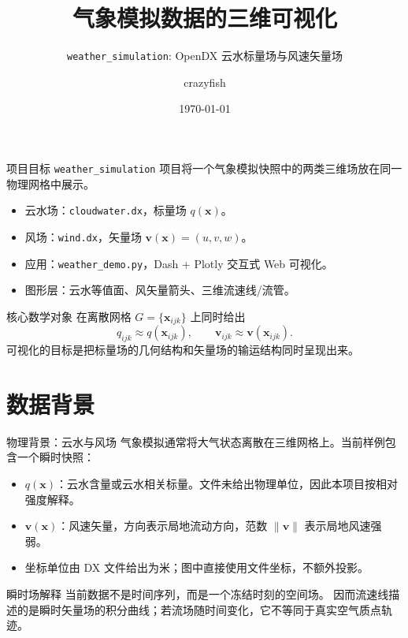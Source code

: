 \documentclass[aspectratio=169,11pt]{ctexbeamer}
\title{气象模拟数据的三维可视化}
\subtitle{\texttt{weather\_simulation}: OpenDX 云水标量场与风速矢量场}
\author{crazyfish}
\date{\today}
\newcommand{\vx}{\mathbf x}
\newcommand{\vv}{\mathbf v}
\begin{document}
\begin{frame}
  \titlepage
\end{frame}

\begin{frame}{项目目标}
  \texttt{weather\_simulation} 项目将一个气象模拟快照中的两类三维场放在同一物理网格中展示。

  \begin{itemize}
    \item 云水场：\texttt{cloudwater.dx}，标量场 $q(\vx)$。
    \item 风场：\texttt{wind.dx}，矢量场 $\vv(\vx)=(u,v,w)$。
    \item 应用：\texttt{weather\_demo.py}，Dash + Plotly 交互式 Web 可视化。
    \item 图形层：云水等值面、风矢量箭头、三维流速线/流管。
  \end{itemize}

  \begin{block}{核心数学对象}
    在离散网格 $G=\{\vx_{ijk}\}$ 上同时给出
    \[
      q_{ijk}\approx q(\vx_{ijk}),\qquad
      \vv_{ijk}\approx \vv(\vx_{ijk}) .
    \]
    可视化的目标是把标量场的几何结构和矢量场的输运结构同时呈现出来。
  \end{block}
\end{frame}

\section{数据背景}

\begin{frame}{物理背景：云水与风场}
  \small
  气象模拟通常将大气状态离散在三维网格上。当前样例包含一个瞬时快照：

  \begin{itemize}
    \item $q(\vx)$：云水含量或云水相关标量。文件未给出物理单位，因此本项目按相对强度解释。
    \item $\vv(\vx)$：风速矢量，方向表示局地流动方向，范数 $\|\vv\|$ 表示局地风速强弱。
    \item 坐标单位由 DX 文件给出为米；图中直接使用文件坐标，不额外投影。
  \end{itemize}

  \begin{block}{瞬时场解释}
    当前数据不是时间序列，而是一个冻结时刻的空间场。
    因而流速线描述的是瞬时矢量场的积分曲线；若流场随时间变化，它不等同于真实空气质点轨迹。
  \end{block}
\end{frame}
\end{document}
